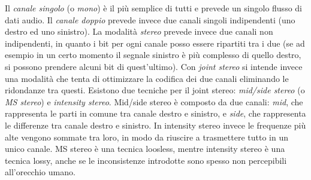 			Il \textit{canale singolo} (o \textit{mono}) è il più semplice di tutti e prevede un singolo flusso di dati audio. Il \textit{canale doppio} prevede invece due canali singoli indipendenti (uno destro ed uno sinistro). La modalità \textit{stereo} prevede invece due canali non indipendenti, in quanto i bit per ogni canale posso essere ripartiti tra i due (se ad esempio in un certo momento il segnale sinistro è più complesso di quello destro, si possono prendere alcuni bit di quest'ultimo). Con \textit{joint stereo} si intende invece una modalità che tenta di ottimizzare la codifica dei due canali eliminando le ridondanze tra questi. Esistono due tecniche per il joint stereo: \textit{mid/side stereo} (o \textit{MS stereo}) e \textit{intensity stereo}. Mid/side stereo è composto da due canali: \textit{mid}, che rappresenta le parti in comune tra canale destro e sinistro, e \textit{side}, che rappresenta le differenze tra canale destro e sinistro. In intensity stereo invece le frequenze più alte vengono sommate tra loro, in modo da riuscire a trasmettere tutto in un unico canale. MS stereo è una tecnica loosless, mentre intensity stereo è una tecnica lossy, anche se le inconsistenze introdotte sono spesso non percepibili all'orecchio umano.
			
